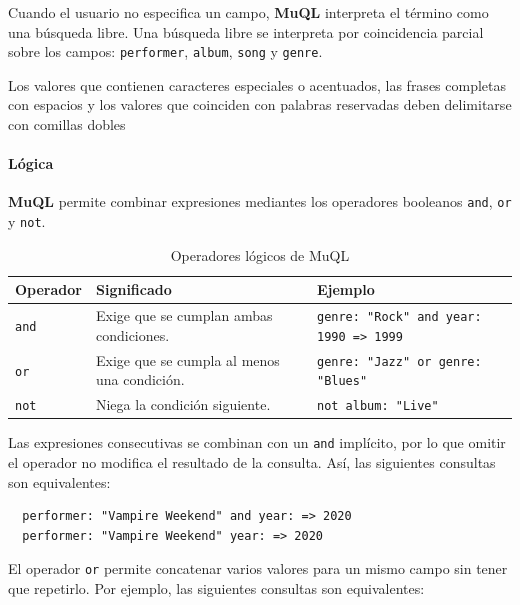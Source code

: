 Cuando el usuario no especifica un campo, \textbf{MuQL} interpreta el término como una búsqueda libre.
Una búsqueda libre se interpreta por coincidencia parcial sobre los campos: \texttt{performer},
\texttt{album}, \texttt{song} y \texttt{genre}.

Los valores que contienen caracteres especiales o acentuados, las frases completas con espacios y los
valores que coinciden con palabras reservadas deben delimitarse con comillas dobles

\paragraph{Lógica}

\textbf{MuQL} permite combinar expresiones mediantes los operadores booleanos \texttt{and}, \texttt{or}
y \texttt{not}.

\begin{table}[htbp]
	\centering
	\begin{tabularx}{\textwidth}{l X X}
		\toprule
		\textbf{Operador} & \textbf{Significado}                          & \textbf{Ejemplo} \\
		\midrule
		\texttt{and}
		                  & Exige que se cumplan ambas condiciones.
		                  & \texttt{genre: "Rock" and year: 1990 => 1999}                    \\
		\addlinespace
		\texttt{or}
		                  & Exige que se cumpla al menos una condición.
		                  & \texttt{genre: "Jazz" or genre: "Blues"}                         \\
		\addlinespace
		\texttt{not}
		                  & Niega la condición siguiente.
		                  & \texttt{not album: "Live"}                                       \\
		\bottomrule
	\end{tabularx}
	\caption{Operadores lógicos de MuQL}
\end{table}

Las expresiones consecutivas se combinan con un \texttt{and} implícito, por lo que omitir el operador
no modifica el resultado de la consulta. Así, las siguientes consultas son equivalentes:

\begin{lstlisting}
  performer: "Vampire Weekend" and year: => 2020
  performer: "Vampire Weekend" year: => 2020
\end{lstlisting}

El operador \texttt{or} permite concatenar varios valores para un mismo campo sin tener que repetirlo.
Por ejemplo, las siguientes consultas son equivalentes:

